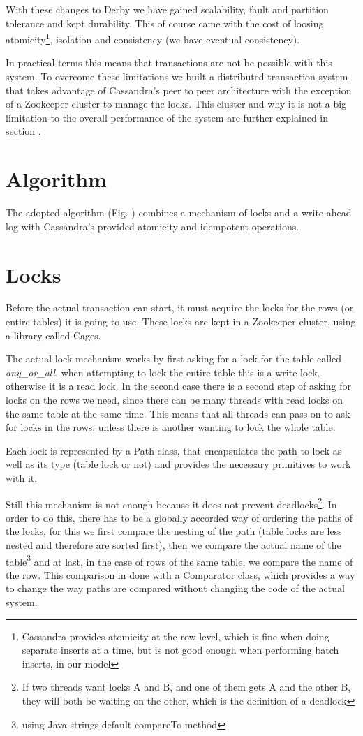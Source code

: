 With these changes to Derby we have gained scalability, fault and partition tolerance and kept durability. This of course came with the cost of loosing atomicity\footnote{Cassandra provides atomicity at the row level, which is fine when doing separate inserts at a time, but is not good enough when performing batch inserts, in our model}, isolation and consistency (we have eventual consistency). 

In practical terms this means that transactions are not be possible with this system. To overcome these limitations we built a distributed transaction system that takes advantage of Cassandra's peer to peer architecture with the exception of a Zookeeper cluster to manage the locks. This cluster and why it is not a big limitation to the overall performance of the system are further explained in section .

\section{Algorithm}
The adopted algorithm (Fig. ) combines a mechanism of locks and a write ahead log with Cassandra's provided atomicity and idempotent operations.


\section{Locks}
Before the actual transaction can start, it must acquire the locks for the rows (or entire tables) it is going to use. These locks are kept in a Zookeeper cluster, using a library called Cages.

The actual lock mechanism works by first asking for a lock for the table called \emph{any\_or\_all}, when attempting to lock the entire table this is a write lock, otherwise it is a read lock. In the second case there is a second step of asking for locks on the rows we need, since there can be many threads with read locks on the same table at the same time. This means that all threads can pass on to ask for locks in the rows, unless there is another wanting to lock the whole table. 

Each lock is represented by a Path class, that encapsulates the path to lock as well as its type (table lock or not) and provides the necessary primitives to work with it. 

Still this mechanism is not enough because it does not prevent deadlocks\footnote{If two threads want locks A and B, and one of them gets A and the other B, they will both be waiting on the other, which is the definition of a deadlock}. In order to do this, there has to be a globally accorded way of ordering the paths of the locks, for this we first compare the nesting of the path (table locks are less nested and therefore are sorted first), then we compare the actual name of the table\footnote{using Java strings default compareTo method} and at last, in the case of rows of the same table, we compare the name of the row. This comparison in done with a Comparator class, which provides a way to change the way paths are compared without changing the code of the actual system.


